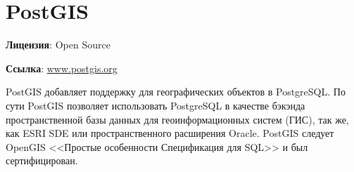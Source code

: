 \section{PostGIS}
\textbf{Лицензия}: Open Source

\textbf{Ссылка}: \href{http://www.postgis.org/}{www.postgis.org}

PostGIS добавляет поддержку для географических объектов в PostgreSQL. По сути PostGIS позволяет использовать PostgreSQL в качестве 
бэкэнда пространственной базы данных для геоинформационных систем (ГИС), так же, как ESRI SDE или пространственного расширения Oracle. 
PostGIS следует OpenGIS <<Простые особенности Спецификация для SQL>> и был сертифицирован.